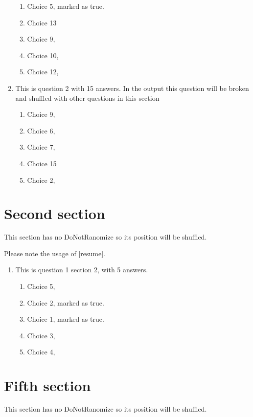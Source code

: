 \documentclass[a4paper,10pt]{article}%
\begin{document}
\begin{enumerate}
\begin{enumerate}
\item  Choice 5, marked as true. %
		\item  Choice 13
		\item  Choice 9,
		\item  Choice 10,
		\item  Choice 12,
		\end{enumerate}
\item  This is question 2 with 15 answers. In the output this question will be broken and shuffled with other questions in this section
	
\begin{enumerate}
\item  Choice 9,
		\item  Choice 6,
		\item  Choice 7,
		\item  Choice 15
	\item  Choice 2,
		\end{enumerate}
\end{enumerate}
\section{Second section}
This section has no DoNotRanomize so its position will be shuffled.

Please note the usage of [resume].
\begin{enumerate}[resume]
	
\item  This is question 1 section 2, with 5 answers.
	
\begin{enumerate}
\item  Choice 5,
	\item  Choice 2, marked as true. %
		\item  Choice 1, marked as true. %
		\item  Choice 3, 
		\item  Choice 4,
		\end{enumerate}
\end{enumerate}
\section{Fifth section}
This section has no DoNotRanomize so its position will be shuffled.
\end{document}
